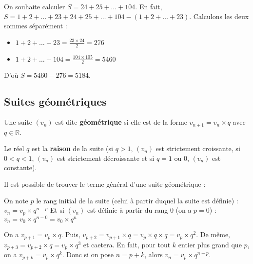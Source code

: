 	\begin{tip}[Exemple]
		On souhaite calculer $S = 24 + 25 + \dots + 104$.
		\newpar
		En fait, $S = 1 + 2 + \dots + 23 + 24 + 25 + \dots + 104 - (1 + 2 + \dots + 23)$. Calculons les deux sommes séparément :
		\begin{itemize}
			\item $1 + 2 + \dots + 23 = \displaystyle{\frac{23 \times 24}{2}} = 276$
			\item $1 + 2 + \dots + 104 = \displaystyle{\frac{104 \times 105}{2}} = 5460$
		\end{itemize}
		D'où $S = 5460 - 276 = 5184$.
	\end{tip}

	\subsection{Suites géométriques}

	\begin{formula}[Définition]
		Une suite $(v_n)$ est dite \textbf{géométrique} si elle est de la forme $v_{n+1} = v_n \times q$ avec $q \in \mathbb{R}$.
	\end{formula}

	\begin{formula}[Raison]
		Le réel $q$ est la \textbf{raison} de la suite (si $q \gt 1$, $(v_n)$ est strictement croissante, si $0 \lt q \lt 1$, $(v_n)$ est strictement décroissante et si $q = 1$ ou $0$, $(v_n)$ est constante).
	\end{formula}

	Il est possible de trouver le terme général d'une suite géométrique :

	\begin{formula}
		On note $p$ le rang initial de la suite (celui à partir duquel la suite est définie) :
		\newpar
		$v_n = v_p \times q^{n-p}$
		\newpar
		Et si $(v_n)$ est définie à partir du rang $0$ (on a $p = 0$) :
		\newpar
		$v_n = v_0 \times q^{n-0} = v_0 \times q^n$
	\end{formula}

	\begin{demonstration}
		On a $v_{p+1} = v_p \times q$. Puis, $v_{p+2} = v_{p+1} \times q = v_p \times q \times q = v_p \times q^2$. De même, $v_{p+3} = v_{p+2} \times q = v_p \times q^3$  et caetera.
		\newline
		En fait, pour tout $k$ entier plus grand que $p$, on a $v_{p+k} = v_p \times q^k$.
		\newline
		Donc si on pose $n = p+k$, alors $v_n = v_p \times q^{n-p}$.
	\end{demonstration}

